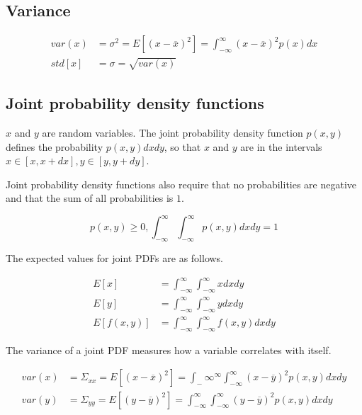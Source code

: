 \subsection{Variance}

\begin{align*}
  var(x) &= \sigma^2 = E[(x - \overline{x})^2] =
    \int_{-\infty}^{\infty} (x - \overline{x})^2 p(x) dx \\
  std[x] &= \sigma = \sqrt{var(x)}
\end{align*}

\subsection{Joint probability density functions}

$x$ and $y$ are random variables. The joint probability density function
$p(x, y)$ defines the probability $p(x, y) dx dy$, so that $x$ and $y$ are in
the intervals $x \in [x, x + dx], y \in [y, y + dy]$.

Joint probability density functions also require that no probabilities are
negative and that the sum of all probabilities is $1$.

\begin{equation*}
  p(x, y) \geq 0, \int_{-\infty}^\infty \int_{-\infty}^{\infty} p(x, y) dx dy =
    1
\end{equation*}

The expected values for joint PDFs are as follows.

\begin{align*}
  E[x] &= \int_{-\infty}^\infty \int_{-\infty}^{\infty} x dx dy \\
  E[y] &= \int_{-\infty}^\infty \int_{-\infty}^{\infty} y dx dy \\
  E[f(x, y)] &= \int_{-\infty}^\infty \int_{-\infty}^{\infty} f(x, y) dx dy
\end{align*}

The variance of a joint PDF measures how a variable correlates with itself.

\begin{align*}
  var(x) &= \Sigma_{xx} = E[(x - \overline{x})^2] =
    \int_-\infty^{\infty} \int_{-\infty}^\infty (x - \overline{y})^2 p(x, y) dx
    dy \\
  var(y) &= \Sigma_{yy} = E[(y - \overline{y})^2] =
    \int_{-\infty}^\infty \int_{-\infty}^\infty (y - \overline{y})^2 p(x, y)
    dx dy \\
\end{align*}

